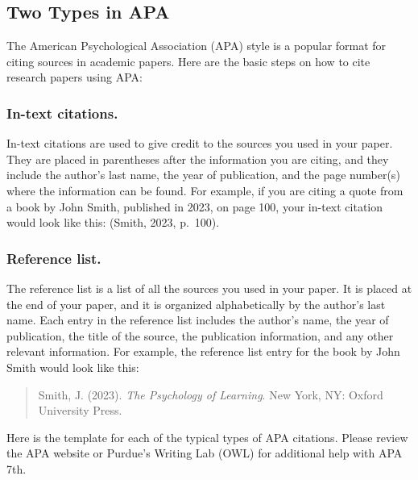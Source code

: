 \documentclass[
  b5paper]{book}
\begin{document}
\hypertarget{two-types-in-apa}{%
\subsection*{Two Types in APA}\label{two-types-in-apa}}

The American Psychological Association (APA) style is a popular format for citing sources in academic papers. Here are the basic steps on how to cite research papers using APA:

\hypertarget{in-text-citations.}{%
\subsubsection*{In-text citations.}\label{in-text-citations.}}

In-text citations are used to give credit to the sources you used in your paper. They are placed in parentheses after the information you are citing, and they include the author's last name, the year of publication, and the page number(s) where the information can be found. For example, if you are citing a quote from a book by John Smith, published in 2023, on page 100, your in-text citation would look like this: (Smith, 2023, p.~100).

\hypertarget{reference-list.}{%
\subsubsection*{Reference list.}\label{reference-list.}}

The reference list is a list of all the sources you used in your paper. It is placed at the end of your paper, and it is organized alphabetically by the author's last name. Each entry in the reference list includes the author's name, the year of publication, the title of the source, the publication information, and any other relevant information. For example, the reference list entry for the book by John Smith would look like this:

\begin{quote}
Smith, J. (2023). \emph{The Psychology of Learning}. New York, NY: Oxford University Press.
\end{quote}

Here is the template for each of the typical types of APA citations. Please review the APA website or Purdue's Writing Lab (OWL) for additional help with APA 7th.
\end{document}

